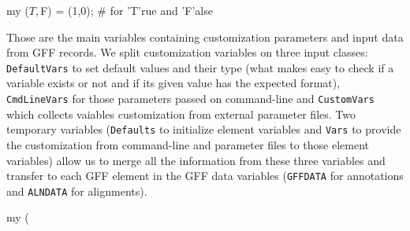 \documentclass[11pt]{article}
\def\nwendcode{\endtrivlist \endgroup} %
\let\nwdocspar=\par                    %
\begin{document}
\nwenddocs{}\endmoddef
my ($T,$F) = (1,0); # for 'T'rue and 'F'alse
\nwendcode{}\nwdocspar

Those are the main variables containing customization parameters and input data from GFF records. We split customization variables on three input classes: {\tt{}{}DefaultVars} to set default values and their type (what makes easy to check if a variable exists or not and if its given value has the expected format), {\tt{}{}CmdLineVars} for those parameters passed on command-line and {\tt{}{}CustomVars} which collects vaiables customization from external parameter files. Two temporary variables ({\tt{}{}Defaults} to initialize element variables and {\tt{}{}Vars} to provide the customization from command-line and parameter files to those element variables) allow us to merge all the information from these three variables and transfer to each GFF element in the GFF data variables ({\tt{}{}GFF{}DATA} for annotations and {\tt{}{}ALN{}DATA} for alignments).

\nwenddocs{}\endmoddef
my (%
\nwendcode{}\nwdocspar
\end{document}
